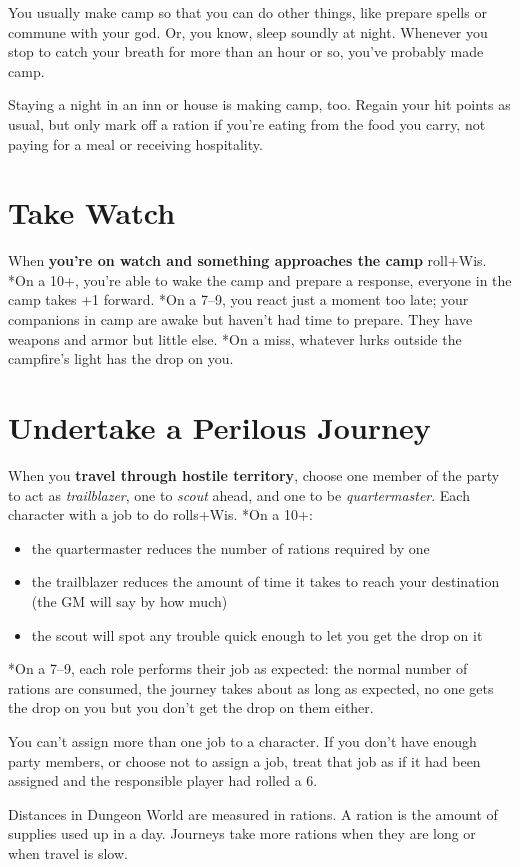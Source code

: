  You usually make camp so that you can do other things, like prepare spells or commune with your god. Or, you know, sleep soundly at night. Whenever you stop to catch your breath for more than an hour or so, you've probably made camp.


 Staying a night in an inn or house is making camp, too. Regain your hit points as usual, but only mark off a ration if you're eating from the food you carry, not paying for a meal or receiving hospitality.
\section*{Take Watch}
\HRule
 When \textbf{you're on watch and something approaches the camp}
 roll+Wis. *On a 10+, you're able to wake the camp and prepare a response, everyone in the camp takes +1 forward. *On a 7--9, you react just a moment too late; your companions in camp are awake but haven't had time to prepare. They have weapons and armor but little else. *On a miss, whatever lurks outside the campfire's light has the drop on you.
\HRule
\section*{Undertake a Perilous Journey}
\HRule
 When you \textbf{travel through hostile territory}, choose one member of the party to act as \emph{trailblazer}, one to \emph{scout} ahead, and one to be \emph{quartermaster}. Each character with a job to do rolls+Wis. *On a 10+:
\begin{itemize}
\item the quartermaster reduces the number of rations required by one
\item the trailblazer reduces the amount of time it takes to reach your destination (the GM will say by how much)
\item the scout will spot any trouble quick enough to let you get the drop on it
\end{itemize}
\HRule

 *On a 7--9, each role performs their job as expected: the normal number of rations are consumed, the journey takes about as long as expected, no one gets the drop on you but you don't get the drop on them either.


 You can't assign more than one job to a character. If you don't have enough party members, or choose not to assign a job, treat that job as if it had been assigned and the responsible player had rolled a 6.


 Distances in Dungeon World are measured in rations. A ration is the amount of supplies used up in a day. Journeys take more rations when they are long or when travel is slow.


